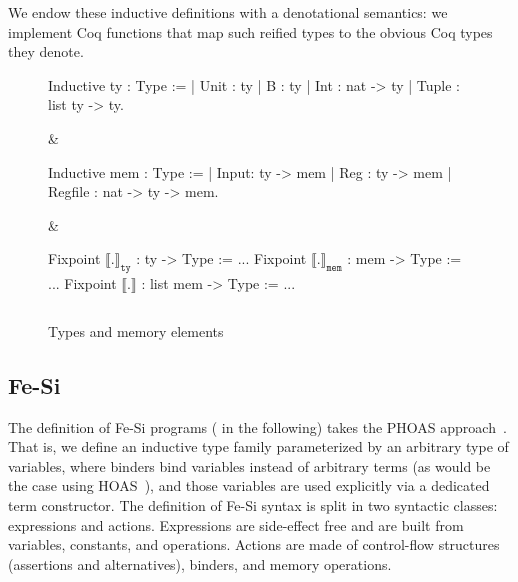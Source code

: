 \documentclass{llncs}
\newcommand{\denote}[1]{\llbracket #1 \rrbracket}
\newcommand{\denotety}[1]{\denote{\mathtt{#1}}_{\mathtt{ty}}}
\newcommand{\denotemem}[1]{\denote{\mathtt{#1}}_{\mathtt{mem}}}
\begin{document}
We endow these inductive definitions with a denotational semantics: we
implement Coq functions that map such reified types to the obvious Coq
types they denote.

\begin{figure}
  \centering
\begin{threelistings}
\begin{coq}
Inductive ty : Type :=
| Unit : ty 
| B : ty 
| Int : nat -> ty
| Tuple : list ty -> ty.     
\end{coq}&
\begin{coq}
Inductive mem : Type :=
| Input: ty ->  mem
| Reg : ty -> mem
| Regfile : nat -> ty -> mem. 
$ $
\end{coq}
&
\begin{coq}
Fixpoint $\denotety{.}$ : ty -> Type := ...
Fixpoint $\denotemem{.}$ : mem -> Type := ...
Fixpoint $\denote{.}$ : list mem -> Type := ...

$ $
\end{coq}
\end{threelistings}
\caption{Types and memory elements}
  \label{fig:type}
\end{figure}




\subsection{Fe-Si}
The definition of Fe-Si programs ( in the following)
takes the PHOAS approach~\cite{phoas-chlipala}. 
%
That is, we define an inductive type family parameterized by an
arbitrary type  of variables, where binders bind variables
instead of arbitrary terms (as would be the case using
HOAS~\cite{DBLP:conf/pldi/PfenningE88}), and those variables are used
explicitly via a dedicated term constructor.
%
The definition of Fe-Si syntax is split in two syntactic classes:
expressions and actions. 
%
Expressions are side-effect free and are built from variables,
constants, and operations.
%
Actions are made of control-flow structures (assertions and
alternatives), binders, and memory operations. 
\end{document}
